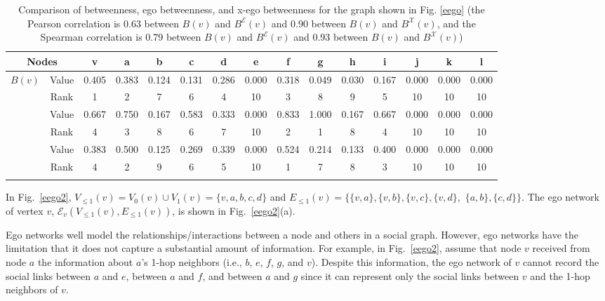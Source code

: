 \documentclass[journal]{IEEEtran}
\newcommand{\V}[2]{V_{#2}({#1})}
\newcommand{\LV}[2]{V_{\le #2}({#1})}
\newcommand{\LE}[2]{E_{\le #2}({#1})}
\newcommand{\EN}[1]{\mathcal{E}_{{#1}}}
\newcommand{\B}[1]{B({#1})}
\newcommand{\BE}[1]{B^{\mathcal{E}}({#1})}
\newcommand{\BX}[1]{B^{\mathcal{X}}({#1})}
\theoremstyle{definition}
\begin{document}
\begin{center}
\begin{table*}[t]
 \caption{Comparison of betweenness, ego betweenness, and x-ego betweenness for the graph shown in Fig. \ref{eego} (the Pearson correlation is 0.63 between $\B{v}$ and $\BE{v}$ and 0.90 between $\B{v}$ and $\BX{v}$, and the Spearman correlation is 0.79 between $\B{v}$ and $\BE{v}$ and 0.93 between $\B{v}$ and $\BX{v}$)}\label{comparison}
 \resizebox{17.4cm}{!} {
 \begin{tabular}{|c|c|c|c|c|c|c|c|c|c|c|c|c|c|c|}
 \hline
\multicolumn{2}{|c|}{Nodes} & v & a & b & c & d & e & f & g & h & i & j & k & l \\
 \hline
\multirow{2}{*}{$\B{v}$} & Value & 0.405 & 0.383 & 0.124 & 0.131 & 0.286 & 0.000 & 0.318 & 0.049 & 0.030 & 0.167 & 0.000 & 0.000 & 0.000\\
\hhline{~--------------}
& Rank & 1 & 2 & 7 & 6 & 4 & 10 & 3 & 8 & 9 & 5 & 10 & 10 & 10\\
\hhline{---------------}
\multirow{2}{*}{$\BE{v}$} & Value & 0.667 & 0.750 & 0.167 & 0.583 & 0.333 & 0.000 & 0.833 & 1.000 & 0.167 & 0.667 & 0.000 & 0.000 & 0.000\\
\hhline{~--------------}
& Rank & 4 & 3 & 8 & 6 & 7 & 10 & 2 & 1 & 8 & 4 & 10 & 10 & 10\\
\hhline{---------------}
\multirow{2}{*}{$\BX{v}$} & Value & 0.383 & 0.500 & 0.125 & 0.269 & 0.339 & 0.000 & 0.524 & 0.214 & 0.133 & 0.400 & 0.000 & 0.000 & 0.000\\
\hhline{~--------------}
& Rank & 4 & 2 & 9 & 6 & 5 & 10 & 1 & 7 & 8 & 3 & 10 & 10 & 10\\
\hhline{---------------}
 \hline
 \end{tabular}
}
\end{table*}
\end{center}

\vspace{-10mm}In Fig.~\ref{eego2}, $\LV{v}{1} = \V{v}{0} \cup \V{v}{1} = \{v, a, b, c, d\}$ and $\LE{v}{1}=\{ \{v, a\}, \{v, b\}, \{v, c\}, \{v, d\},$ $\{a, b\}, \{c, d\} \}$.
The ego network of vertex $v$, $\EN{v}(\LV{v}{1}, \LE{v}{1})$, is shown in Fig.~\ref{eego2}(a).

Ego networks well model the relationships/interactions between a node and others in a social graph.
However, ego networks have the limitation that it does not capture a substantial amount of information.
For example, in Fig.~\ref{eego2}, assume that node $v$ received from node $a$ the information about $a$'s 1-hop neighbors (i.e., $b$, $e$, $f$, $g$, and $v$).
Despite this information, the ego network of $v$ cannot record the social links between $a$ and $e$, between $a$ and $f$, and between $a$ and $g$ since it can represent only the social links between $v$ and the 1-hop neighbors of $v$.
\end{document}
